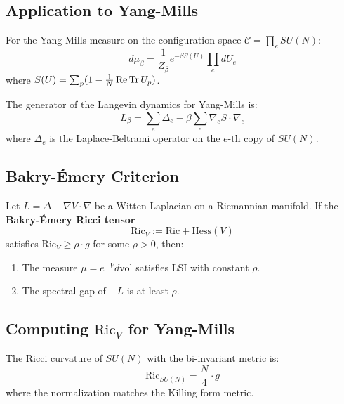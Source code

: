 \subsection{Application to Yang-Mills}

For the Yang-Mills measure on the configuration space $\mathcal{C} = \prod_{e} SU(N)$:
\begin{equation}
    d\mu_\beta = \frac{1}{Z_\beta} e^{-\beta S(U)} \prod_e dU_e
\end{equation}
where $S(U) = \sum_p (1 - \frac{1}{N} \operatorname{Re} \operatorname{Tr} U_p)$.

\begin{definition}
The generator of the Langevin dynamics for Yang-Mills is:
\begin{equation}
    L_\beta = \sum_e \Delta_e - \beta \sum_e \nabla_e S \cdot \nabla_e
\end{equation}
where $\Delta_e$ is the Laplace-Beltrami operator on the $e$-th copy of $SU(N)$.
\end{definition}

\subsection{Bakry-\'Emery Criterion}

\begin{theorem}\label{thm:bakry-emery-app212}
Let $L = \Delta - \nabla V \cdot \nabla$ be a Witten Laplacian on a Riemannian manifold. If the \textbf{Bakry-\'Emery Ricci tensor}
\begin{equation}
    \mathrm{Ric}_V := \mathrm{Ric} + \mathrm{Hess}(V)
\end{equation}
satisfies $\mathrm{Ric}_V \geq \rho \cdot g$ for some $\rho > 0$, then:
\begin{enumerate}
    \item The measure $\mu = e^{-V} d\text{vol}$ satisfies LSI with constant $\rho$.
    \item The spectral gap of $-L$ is at least $\rho$.
\end{enumerate}
\end{theorem}

\subsection{Computing \texorpdfstring{$\mathrm{Ric}_V$}{Ric\_V} for Yang-Mills}

\begin{proposition}
The Ricci curvature of $SU(N)$ with the bi-invariant metric is:
\begin{equation}
    \mathrm{Ric}_{SU(N)} = \frac{N}{4} \cdot g
\end{equation}
where the normalization matches the Killing form metric.
\end{proposition}

